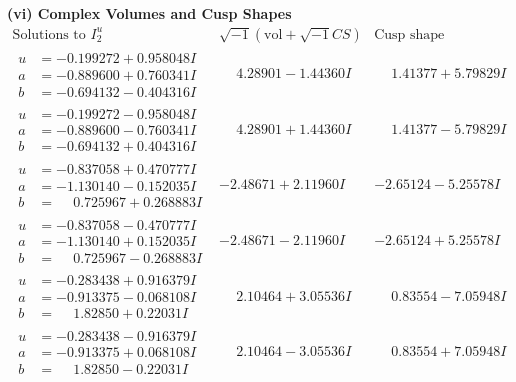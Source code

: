 \documentclass[1p]{elsarticle_modified}
\theoremstyle{definition}
\newcommand{\I}{\sqrt{-1}}
\begin{document}
\newpage\flushleft \textbf{(vi) Complex Volumes and Cusp Shapes}
$$\begin{array}{c|c|c}  
\text{Solutions to }I^u_{2}& \I (\text{vol} + \sqrt{-1}CS) & \text{Cusp shape}\\
 \hline 
\begin{aligned}
u &= -0.199272 + 0.958048 I \\
a &= -0.889600 + 0.760341 I \\
b &= -0.694132 - 0.404316 I\end{aligned}
 & \phantom{-}4.28901 - 1.44360 I & \phantom{-}1.41377 + 5.79829 I \\ \hline\begin{aligned}
u &= -0.199272 - 0.958048 I \\
a &= -0.889600 - 0.760341 I \\
b &= -0.694132 + 0.404316 I\end{aligned}
 & \phantom{-}4.28901 + 1.44360 I & \phantom{-}1.41377 - 5.79829 I \\ \hline\begin{aligned}
u &= -0.837058 + 0.470777 I \\
a &= -1.130140 - 0.152035 I \\
b &= \phantom{-}0.725967 + 0.268883 I\end{aligned}
 & -2.48671 + 2.11960 I & -2.65124 - 5.25578 I \\ \hline\begin{aligned}
u &= -0.837058 - 0.470777 I \\
a &= -1.130140 + 0.152035 I \\
b &= \phantom{-}0.725967 - 0.268883 I\end{aligned}
 & -2.48671 - 2.11960 I & -2.65124 + 5.25578 I \\ \hline\begin{aligned}
u &= -0.283438 + 0.916379 I \\
a &= -0.913375 - 0.068108 I \\
b &= \phantom{-}1.82850 + 0.22031 I\end{aligned}
 & \phantom{-}2.10464 + 3.05536 I & \phantom{-}0.83554 - 7.05948 I \\ \hline\begin{aligned}
u &= -0.283438 - 0.916379 I \\
a &= -0.913375 + 0.068108 I \\
b &= \phantom{-}1.82850 - 0.22031 I\end{aligned}
 & \phantom{-}2.10464 - 3.05536 I & \phantom{-}0.83554 + 7.05948 I \\ \hline\begin{aligned}

\end{aligned}
\end{array}$$
\end{document}

